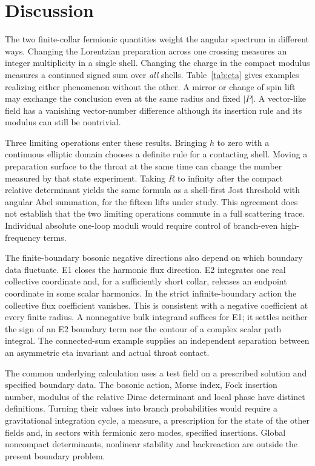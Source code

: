 \section{Discussion}
The two finite-collar fermionic quantities weight the angular spectrum in different ways. Changing the Lorentzian preparation across one crossing measures an integer multiplicity in a single shell. Changing the charge in the compact modulus measures a continued signed sum over \emph{all} shells. Table~\ref{tab:eta} gives examples realizing either phenomenon without the other. A mirror or change of spin lift may exchange the conclusion even at the same radius and fixed $|P|$. A vector-like field has a vanishing vector-number difference although its insertion rule and its modulus can still be nontrivial.

Three limiting operations enter these results. Bringing $h$ to zero with a continuous elliptic domain chooses a definite rule for a contacting shell. Moving a preparation surface to the throat at the same time can change the number measured by that state experiment. Taking $R$ to infinity after the compact relative determinant yields the same formula as a shell-first Jost threshold with angular Abel summation, for the fifteen lifts under study. This agreement does not establish that the two limiting operations commute in a full scattering trace. Individual absolute one-loop moduli would require control of branch-even high-frequency terms.

The finite-boundary bosonic negative directions also depend on which boundary data fluctuate. E1 closes the harmonic flux direction. E2 integrates one real collective coordinate and, for a sufficiently short collar, releases an endpoint coordinate in some scalar harmonics. In the strict infinite-boundary action the collective flux coefficient vanishes. This is consistent with a negative coefficient at every finite radius. A nonnegative bulk integrand suffices for E1; it settles neither the sign of an E2 boundary term nor the contour of a complex scalar path integral. The connected-sum example supplies an independent separation between an asymmetric eta invariant and actual throat contact.

The common underlying calculation uses a test field on a prescribed solution and specified boundary data. The bosonic action, Morse index, Fock insertion number, modulus of the relative Dirac determinant and local phase have distinct definitions. Turning their values into branch probabilities would require a gravitational integration cycle, a measure, a prescription for the state of the other fields and, in sectors with fermionic zero modes, specified insertions. Global noncompact determinants, nonlinear stability and backreaction are outside the present boundary problem.
